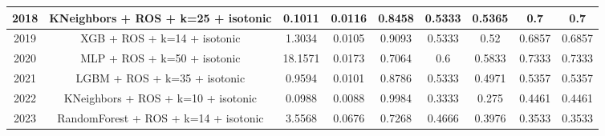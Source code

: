 \begin{table}[h]
{{{\begin{tabular}{ccccccccc}
2018 & KNeighbors + ROS + k=25 + isotonic         & 0.1011        & 0.0116        & 0.8458           & 0.5333           & 0.5365   & 0.7            & 0.7              \\ \hline
2019 & XGB + ROS + k=14 + isotonic                & 1.3034        & 0.0105        & 0.9093           & 0.5333           & 0.52     & 0.6857         & 0.6857           \\ \hline
2020 & MLP + ROS + k=50 + isotonic                & 18.1571       & 0.0173        & 0.7064           & 0.6              & 0.5833   & 0.7333         & 0.7333           \\ \hline
2021 & LGBM + ROS + k=35 + isotonic               & 0.9594        & 0.0101        & 0.8786           & 0.5333           & 0.4971   & 0.5357         & 0.5357           \\ \hline
2022 & KNeighbors + ROS + k=10 + isotonic         & 0.0988        & 0.0088        & 0.9984           & 0.3333           & 0.275    & 0.4461         & 0.4461           \\ \hline
2023 & RandomForest + ROS + k=14 + isotonic       & 3.5568        & 0.0676        & 0.7268           & 0.4666           & 0.3976   & 0.3533         & 0.3533           \\ \hline
\end{tabular}%
}}}
\end{table}

\newpage